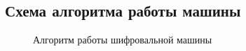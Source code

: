 
\subsection{Схема алгоритма работы машины}

\begin{figure}[h]
    \centering
    \def\svgwidth{0.6\textwidth}
    
    \caption{Алгоритм работы шифровальной машины}
    \label{fig:auth_alg}
\end{figure}



